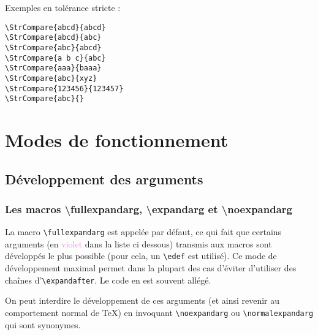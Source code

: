 \documentclass[a4paper,10pt]{article}
\newcommand\styleexemple{\small\vskip4pt}
\newcommand\verbinline{\lstinline[basicstyle=\normalsize\ttfamily]}
\begin{document}
Exemples en tolérance stricte :\par\nobreak
\begin{minipage}[t]{0.65\linewidth}
\comparestrict
\begin{lstlisting}
\StrCompare{abcd}{abcd}
\StrCompare{abcd}{abc}
\StrCompare{abc}{abcd}
\StrCompare{a b c}{abc}
\StrCompare{aaa}{baaa}
\StrCompare{abc}{xyz}
\StrCompare{123456}{123457}
\StrCompare{abc}{}
\end{lstlisting}%
\end{minipage}\hfill
\begin{minipage}[t]{0.35\linewidth}
	\styleexemple
	\comparestrict
	\par
	\par
	\par
	\par
	\par
	\par
	\par
\end{minipage}%

\section{Modes de fonctionnement}
\subsection{Développement des arguments}
\label{devarg}
\lstset{basicstyle=\footnotesize\ttfamily}
\subsubsection{Les macros {\ttfamily \textbackslash fullexpandarg}, {\ttfamily \textbackslash expandarg} et {\ttfamily \textbackslash noexpandarg}}
La macro \verbinline|\fullexpandarg| est appelée par défaut, ce qui fait que certains arguments (en \textcolor{violet}{violet} dans la liste ci dessous) transmis aux macros sont développés le plus possible (pour cela, un \verb|\edef| est utilisé). Ce mode de développement maximal permet dans la plupart des cas d'éviter d'utiliser des chaînes d'\verb|\expandafter|. Le code en est souvent allégé.

On peut interdire le développement de ces arguments (et ainsi revenir au comportement normal de \TeX) en invoquant \verbinline|\noexpandarg| ou \verbinline|\normalexpandarg| qui sont synonymes.\medskip
\end{document}
